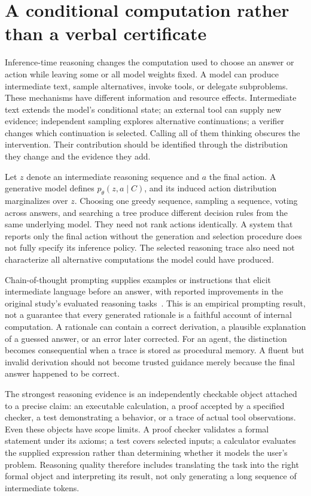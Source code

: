 \section{A conditional computation rather than a verbal certificate}
\label{sec:C09:conditional}
Inference-time reasoning changes the computation used to choose an answer or action while leaving some or all model weights fixed. A model can produce intermediate text, sample alternatives, invoke tools, or delegate subproblems. These mechanisms have different information and resource effects. Intermediate text extends the model's conditional state; an external tool can supply new evidence; independent sampling explores alternative continuations; a verifier changes which continuation is selected. Calling all of them thinking obscures the intervention. Their contribution should be identified through the distribution they change and the evidence they add.

Let $z$ denote an intermediate reasoning sequence and $a$ the final action. A generative model defines $p_\theta(z,a\mid C)$, and its induced action distribution marginalizes over $z$. Choosing one greedy sequence, sampling a sequence, voting across answers, and searching a tree produce different decision rules from the same underlying model. They need not rank actions identically. A system that reports only the final action without the generation and selection procedure does not fully specify its inference policy. The selected reasoning trace also need not characterize all alternative computations the model could have produced.

Chain-of-thought prompting supplies examples or instructions that elicit intermediate language before an answer, with reported improvements in the original study's evaluated reasoning tasks~\cite{wei2022cot}. This is an empirical prompting result, not a guarantee that every generated rationale is a faithful account of internal computation. A rationale can contain a correct derivation, a plausible explanation of a guessed answer, or an error later corrected. For an agent, the distinction becomes consequential when a trace is stored as procedural memory. A fluent but invalid derivation should not become trusted guidance merely because the final answer happened to be correct.

The strongest reasoning evidence is an independently checkable object attached to a precise claim: an executable calculation, a proof accepted by a specified checker, a test demonstrating a behavior, or a trace of actual tool observations. Even these objects have scope limits. A proof checker validates a formal statement under its axioms; a test covers selected inputs; a calculator evaluates the supplied expression rather than determining whether it models the user's problem. Reasoning quality therefore includes translating the task into the right formal object and interpreting its result, not only generating a long sequence of intermediate tokens.

